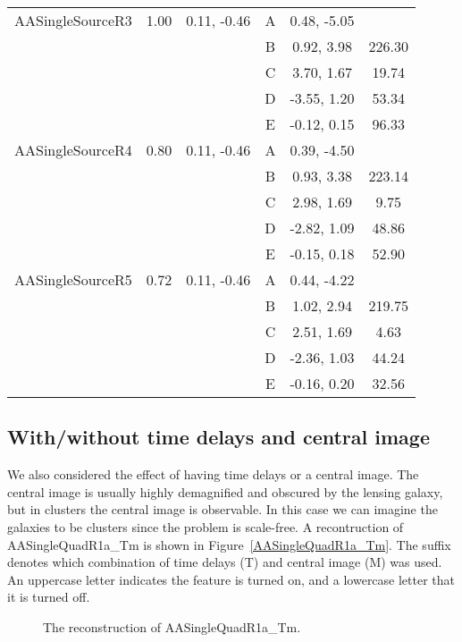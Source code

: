 \documentclass[onecolumn,galley]{mn2e}
\newcommand{\figref}[1] {Figure~\ref{#1}}
\newcommand\plotone[1]{%
 \centering
 \leavevmode
 \texttt{[image: \#1]}%
}%
\begin{document}
\begin{table}
\begin{tabular}{lccccc}
AASingleSourceR3 & 1.00 & 0.11, -0.46 & A & 0.48, -5.05 & \\
 & & & B & 0.92, 3.98 & 226.30\\
 & & & C & 3.70, 1.67 & 19.74\\
 & & & D & -3.55, 1.20 & 53.34\\
 & & & E & -0.12, 0.15 & 96.33\\
AASingleSourceR4 & 0.80 & 0.11, -0.46 & A & 0.39, -4.50 & \\
 & & & B & 0.93, 3.38 & 223.14\\
 & & & C & 2.98, 1.69 & 9.75\\
 & & & D & -2.82, 1.09 & 48.86\\
 & & & E & -0.15, 0.18 & 52.90\\
AASingleSourceR5 & 0.72 & 0.11, -0.46 & A & 0.44, -4.22 & \\
 & & & B & 1.02, 2.94 & 219.75\\
 & & & C & 2.51, 1.69 & 4.63\\
 & & & D & -2.36, 1.03 & 44.24\\
 & & & E & -0.16, 0.20 & 32.56
\end{tabular}
\end{table}


\subsection{With/without time delays and central image} %

We also considered the effect of having time delays or a central image. The
central image is usually highly demagnified and obscured by the lensing galaxy,
but in clusters the central image is observable. In this case we can imagine
the galaxies to be clusters since the problem is scale-free. A recontruction of
AASingleQuadR1a\_Tm is shown in \figref{AASingleQuadR1a_Tm}. The suffix denotes
which combination of time delays (T) and central image (M) was used. An
uppercase letter indicates the feature is turned on, and a lowercase letter
that it is turned off.

\begin{figure}
\caption{The reconstruction of AASingleQuadR1a\_Tm.}
\end{figure}
\end{document}
